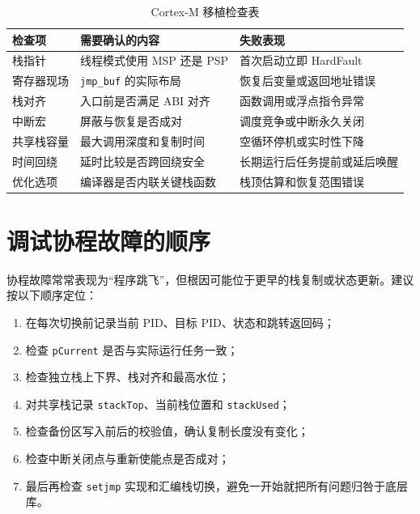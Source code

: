 \begin{table}[htbp]
\centering
\caption{Cortex-M 移植检查表} \label{tab:app-coro-cortex-check}
\begin{tabularx}{\textwidth}{lXX}
\toprule
检查项 & 需要确认的内容 & 失败表现 \\
\midrule
栈指针 & 线程模式使用 MSP 还是 PSP & 首次启动立即 HardFault \\
寄存器现场 & \texttt{jmp\_buf} 的实际布局 & 恢复后变量或返回地址错误 \\
栈对齐 & 入口前是否满足 ABI 对齐 & 函数调用或浮点指令异常 \\
中断宏 & 屏蔽与恢复是否成对 & 调度竞争或中断永久关闭 \\
共享栈容量 & 最大调用深度和复制时间 & 空循环停机或实时性下降 \\
时间回绕 & 延时比较是否跨回绕安全 & 长期运行后任务提前或延后唤醒 \\
优化选项 & 编译器是否内联关键栈函数 & 栈顶估算和恢复范围错误 \\
\bottomrule
\end{tabularx}
\end{table}

\section{调试协程故障的顺序}

协程故障常常表现为“程序跳飞”，但根因可能位于更早的栈复制或状态更新。建议按以下顺序定位：

\begin{enumerate}
\item 在每次切换前记录当前 PID、目标 PID、状态和跳转返回码；
\item 检查 \texttt{pCurrent} 是否与实际运行任务一致；
\item 检查独立栈上下界、栈对齐和最高水位；
\item 对共享栈记录 \texttt{stackTop}、当前栈位置和 \texttt{stackUsed}；
\item 检查备份区写入前后的校验值，确认复制长度没有变化；
\item 检查中断关闭点与重新使能点是否成对；
\item 最后再检查 \texttt{setjmp} 实现和汇编栈切换，避免一开始就把所有问题归咎于底层库。
\end{enumerate}

